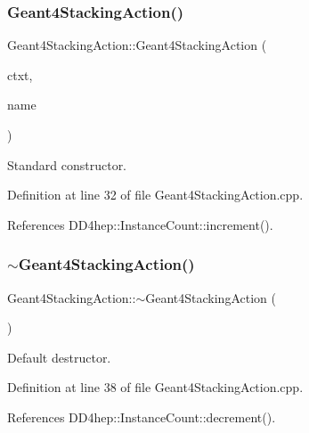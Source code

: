 \subsubsection{\texorpdfstring{Geant4\+Stacking\+Action()}{Geant4StackingAction()}}
{\footnotesize\ttfamily Geant4\+Stacking\+Action\+::\+Geant4\+Stacking\+Action (\begin{DoxyParamCaption}\item[{\hyperlink{class_d_d4hep_1_1_simulation_1_1_geant4_context}{Geant4\+Context} $\ast$}]{ctxt,  }\item[{const std\+::string \&}]{name }\end{DoxyParamCaption})}



Standard constructor. 



Definition at line 32 of file Geant4\+Stacking\+Action.\+cpp.



References D\+D4hep\+::\+Instance\+Count\+::increment().

\hypertarget{class_d_d4hep_1_1_simulation_1_1_geant4_stacking_action_a15dd317e760306d51e728b26aebf65a7}{}\label{class_d_d4hep_1_1_simulation_1_1_geant4_stacking_action_a15dd317e760306d51e728b26aebf65a7} 
\subsubsection{\texorpdfstring{$\sim$\+Geant4\+Stacking\+Action()}{~Geant4StackingAction()}}
{\footnotesize\ttfamily Geant4\+Stacking\+Action\+::$\sim$\+Geant4\+Stacking\+Action (\begin{DoxyParamCaption}{ }\end{DoxyParamCaption})\hspace{0.3cm}{\ttfamily [virtual]}}



Default destructor. 



Definition at line 38 of file Geant4\+Stacking\+Action.\+cpp.



References D\+D4hep\+::\+Instance\+Count\+::decrement().




